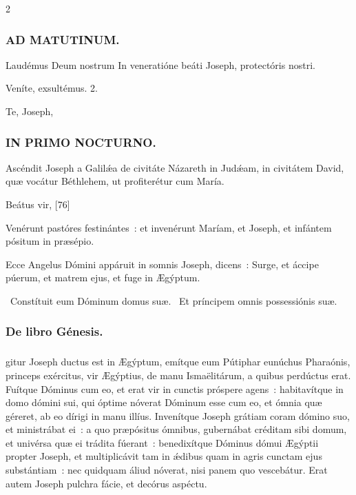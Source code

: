 \documentclass[9pt,twoside]{extarticle}
\begin{document}
\begin{multicols}{2}
{{{\subsubsection*{\center \textsc{AD MATUTINUM.}}
\begin{tightlist}{}
\item {} Laudémus Deum nostrum \textred{*} In veneratióne beáti Joseph, protectóris nostri.
\item {} Veníte, exsultémus. 2.
\item {} Te, Joseph, 
\end{tightlist}

\subsubsection*{\center \textsc{IN PRIMO NOCTURNO.}}
\begin{tightlist}{}
\item {} Ascéndit Joseph a Galilǽa de civitáte Názareth in Judǽam, in civitátem David, quæ vocátur Béthlehem, ut profiterétur cum María.
\item {} Beátus vir,  [76]
\item {} Venérunt pastóres festinántes~: et invenérunt Maríam, et Joseph, et infántem pósitum in præsépio.
\item {} Ecce Angelus Dómini appáruit in somnis Joseph, dicens~: Surge, et áccipe púerum, et matrem ejus, et fuge in Ægýptum.
\item {}~Constítuit eum Dóminum domus suæ. ~Et príncipem omnis possessiónis suæ.
\item {}
\end{tightlist}

\subsubsection*{\center De libro Génesis.}
\subsubsection*{\center {}}
gitur Joseph ductus est in Ægýptum, emítque eum Pútiphar eunúchus Pharaónis, princeps exércitus, vir Ægýptius, de manu Ismaëlitárum, a quibus perdúctus erat.
Fuítque Dóminus cum eo, et erat vir in cunctis próspere agens~: habitavítque in domo dómini sui,
qui óptime nóverat Dóminum esse cum eo, et ómnia quæ géreret, ab eo dírigi in manu illíus.
Invenítque Joseph grátiam coram dómino suo, et ministrábat ei~: a quo præpósitus ómnibus, gubernábat créditam sibi domum, et univérsa quæ ei trádita fúerant~:
benedixítque Dóminus dómui Ægýptii propter Joseph, et multiplicávit tam in ǽdibus quam in agris cunctam ejus substántiam~:
nec quidquam áliud nóverat, nisi panem quo vescebátur. Erat autem Joseph pulchra fácie, et decórus aspéctu.

}}}
\end{multicols}
\end{document}
